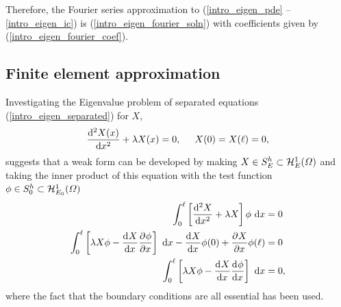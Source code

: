 Therefore, the Fourier series approximation to (\ref{intro_eigen_pde} -- \ref{intro_eigen_ic}) is (\ref{intro_eigen_fourier_soln}) with coefficients given by (\ref{intro_eigen_fourier_coef}).

\subsection{Finite element approximation}

Investigating the Eigenvalue problem of separated equations (\ref{intro_eigen_separated}) for $X$,
\begin{align*}
  \totder[2]{X(x)}{x} + \lambda X(x) = 0, \hspace{5mm} X(0) = X(\ell) = 0,
\end{align*}
suggests that a weak form can be developed by making $X \in \trialspace$ and taking the inner product of this equation with the test function $\phi \in \testspace$
\begin{align}
  \int_0^{\ell} \left[ \totder[2]{X}{x} + \lambda X \right]\phi \d{x} &= 0 \notag \\
  \int_0^{\ell} \left[ \lambda X \phi - \totder{X}{x} \parder{\phi}{x} \right] \d{x} - \totder{X}{x} \phi(0) + \parder{X}{x} \phi(\ell) &= 0 \notag \\
  \label{intro_eigen_weak_form}
  \int_0^{\ell} \left[ \lambda X \phi - \totder{X}{x} \totder{\phi}{x} \right] \d{x} &= 0,
\end{align}
where the fact that the boundary conditions are all essential has been used.

